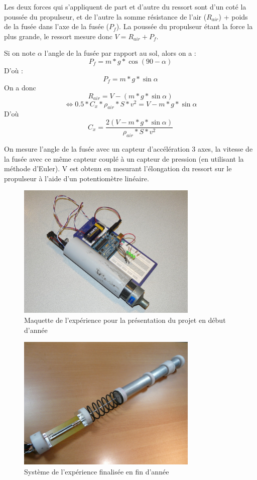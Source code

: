 \documentclass[a4paper,12pt]{scrartcl}
\begin{document}
		Les deux forces qui s'appliquent de part et d'autre du ressort sont d'un coté la poussée du propulseur, et de l'autre la somme résistance de l'air ($R_{air}$) + poids de la fusée dans l'axe de la fusée ($P_f$).
		La poussée du propulseur étant la force la plus grande, le ressort mesure donc $V = R_{air} + P_f$.
		
		Si on note $\alpha$ l'angle de la fusée par rapport au sol, alors on a : 
		  $$ P_f = m * g * \cos{(90-\alpha)}$$
		D'où : 
		  $$ P_f =  m * g * \sin{\alpha}$$		
		On a donc 
		  $$ R_{air} = V - ( m * g * \sin{\alpha})$$
		  $$ \Leftrightarrow 0.5 * C_x * \rho_{air} * S * v^2 = V - m * g * \sin{\alpha} $$
		D'où
		  $$ C_x = \frac{2(V - m * g * \sin{\alpha})}{\rho_{air} * S * v^2} $$
		
		On mesure l'angle de la fusée avec un capteur d'accélération 3 axes, la vitesse de la fusée avec ce même capteur couplé à un capteur de pression (en utilisant la méthode d'Euler).
		V est obtenu en mesurant l'élongation du ressort sur le propulseur à l'aide d'un potentiomètre linéaire.
		\begin{figure}[H]
		    \begin{center}
			\caption{ Maquette de l'expérience pour la présentation du projet en début d'année}
			\includegraphics[height=244px, width=326px]{Photos_Mercury/maquette_systeme_ressort.jpg}
		     \end{center}
		\end{figure}
		\begin{figure}[H]
		    \begin{center}
			\caption{ Système de l'expérience finalisée en fin d'année }
			\includegraphics[height=244px, width=326px]{Photos_Mercury/systemeressort.jpg}
		     \end{center}
		\end{figure}
\end{document}
